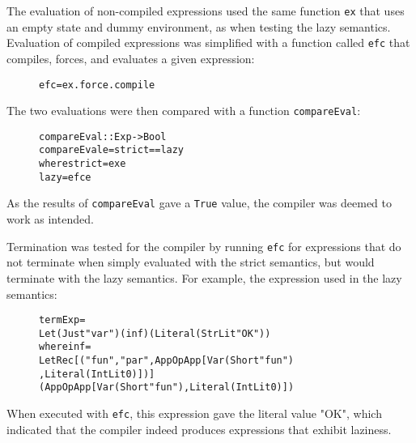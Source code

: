 The evaluation of non-compiled
expressions used the same function \texttt{ex} that uses an empty state and
dummy environment, as when testing the lazy semantics. Evaluation of
compiled expressions was simplified with a function called \texttt{efc} that
compiles, forces, and evaluates a given expression:

\begin{figure}[H]
\begin{alltt}
  efc = ex . force . compile
\end{alltt}
\end{figure}

\noindent The two evaluations were then compared with a function \texttt{compareEval}:

\begin{figure}[H]
\begin{alltt}
  compareEval :: Exp -> Bool
  compareEval e = strict == lazy
    where strict = ex e
          lazy   = efc e
\end{alltt}
\end{figure}

\noindent As the results of \texttt{compareEval} gave a \texttt{True} value,
the compiler was deemed to work as intended.

Termination was tested for the compiler by running \texttt{efc} for expressions
that do not terminate when simply evaluated with the strict semantics, but would
terminate with the lazy semantics. For example, the expression used in the lazy
semantics:

\begin{figure}[H]
\begin{alltt}
  termExp =
    Let (Just "var") (inf) (Literal (StrLit "OK"))
    where inf =
      LetRec [("fun", "par", App OpApp [Var (Short "fun")
                                       ,Literal (IntLit 0)])]
      (App OpApp [Var (Short "fun"), Literal (IntLit 0)])
\end{alltt}
\end{figure}

\noindent When executed with \texttt{efc}, this expression gave the literal
value "OK", which indicated that the compiler indeed produces expressions that
exhibit laziness.
